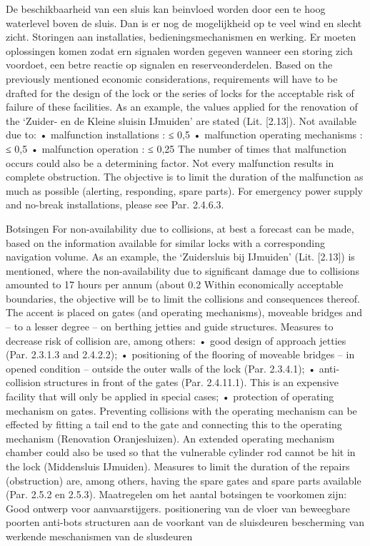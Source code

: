 De beschikbaarheid van een sluis kan beinvloed worden door een te hoog  waterlevel boven de sluis.
Dan is er nog de mogelijkheid op te veel wind en slecht zicht.
Storingen aan installaties, bedieningsmechanismen en werking. Er moeten oplossingen komen  zodat ern signalen worden gegeven wanneer een storing zich voordoet, een betre reactie op signalen en  reserveonderdelen.
Based on the previously mentioned economic considerations, requirements will have to be drafted for
the design of the lock or the series of locks for the acceptable risk of failure of these facilities. As an
example, the values applied for the renovation of the ‘Zuider- en de Kleine sluisin IJmuiden’ are stated
(Lit. [2.13]). Not available due to:
• malfunction installations : ≤ 0,5%
• malfunction operating mechanisms : ≤ 0,5%
• malfunction operation : ≤ 0,25%
The number of times that malfunction occurs could also be a determining factor.
Not every malfunction results in complete obstruction. The objective is to limit the duration of the malfunction
as much as possible (alerting, responding, spare parts).
For emergency power supply and no-break installations, please see Par. 2.4.6.3.

Botsingen
For non-availability due to collisions, at best a forecast can be made, based on the information available
for similar locks with a corresponding navigation volume. As an example, the ‘Zuidersluis bij IJmuiden’
(Lit. [2.13]) is mentioned, where the non-availability due to significant damage due to collisions amounted
to 17 hours per annum (about 0.2%
Within economically acceptable boundaries, the objective will be to limit the collisions and consequences
thereof. The accent is placed on gates (and operating mechanisms), moveable bridges and – to a
lesser degree – on berthing jetties and guide structures.
Measures to decrease risk of collision are, among others:
• good design of approach jetties (Par. 2.3.1.3 and 2.4.2.2);
• positioning of the flooring of moveable bridges – in opened condition – outside the outer walls of the
lock (Par. 2.3.4.1);
• anti-collision structures in front of the gates (Par. 2.4.11.1). This is an expensive facility that will only
be applied in special cases;
• protection of operating mechanism on gates. Preventing collisions with the operating mechanism can
be effected by fitting a tail end to the gate and connecting this to the operating mechanism
(Renovation Oranjesluizen). An extended operating mechanism chamber could also be used so that
the vulnerable cylinder rod cannot be hit in the lock (Middensluis IJmuiden).
Measures to limit the duration of the repairs (obstruction) are, among others, having the spare gates and
spare parts available (Par. 2.5.2 en 2.5.3).
Maatregelen om het aantal botsingen te voorkomen zijn:
Good ontwerp voor aanvaarstijgers.
positionering van de vloer van beweegbare poorten
anti-bots structuren aan de voorkant van de sluisdeuren
bescherming van werkende meschanismen van de slusdeuren

